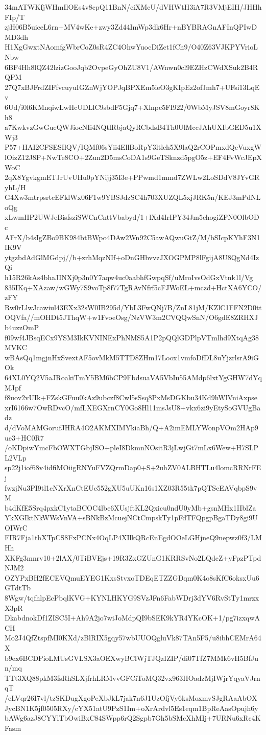 34mATWKfjWHmIlOEs4v8cpQ11BnN/ciXMcU/dVHWtH3iA7R3VMjEIH/JHHhFIp/T
zjH06B5uiceL6rn+MV4wKe+zwy3Zd44ImWp3dk6Hr+nBYBRAGnAFInQPIwDMD3dh
H1XgGwxtNAomfgWbrCoZ0sR4ZC4OhwYuocDiZct1fCh9/O40Z63VJKPYVrioLNbw
6BF4Hh8lQZ42lzizGooJqb2OvpeGyOhZU8V1/AWnwn0cl9EZHzCWdXSuk2B4RQPM
27Q7xBJFrdZIFfvcuyuIGZnWjYOPJqBPXEm5ieO3gKIpEz2ofJmh7+UFsi13LqEv
6Ud/i0l6KMnqiwLwHcUDLlC9sbdF5Gjq7+Xlnpc5FI922/0WbMyJSV8mGoyr8Kh8
a7KwkvzGwGueQWJiocNIi4NQtlRbjaQyRCbdsB4Th0UlMccJAhUXIbGED5u1XWj3
P57+HAI2CFSESIlQV/IQMf06sYii4EllBoRpY3ltlch5X9laQ2rCOPmxdQcVuxgW
lOizZ12J8P+NwTe8CO+2Zun2D5msCoDA1s9GeTSknzd5pgO5z+EF4FvWcJEpXWoC
2qX8YgvkgmETJrUvUHu0pYNijj35I3e+PPwmd1mmd7ZWLw2LoSDdV8JYvGRyhL/H
G4Xw3mtrpsrtcEFklWx06F1w9YBSJdzSC4h703XUZQL5xjJRK5n/KEJ3mPdNLoQg
xLwmHP2UWJeBisfsziSWCnCnttVbabyd/1+lXd4IrIPY34Jm5chogiZFN0OlbODc
AFrX/b4sIgZBo9BK984btBWpo4DAw2Wn92C5awAQwuGtZ/M/bSIcpKYhF3N1IK9V
ytgzbdAdGlMGdpj//b+zrhMqzNIf+oDnGHbvvzJXOGPMP8lFgijA8U8QgNd4IzQi
h15R26kAs4bhaJINXj0p3n0Y7aqw4uc0aabhfGwpqSf/uMroIvsOdGxVtnk1l/Vg
835IKq+XAzaw/wGWy7S9voTp8f77TgRAvNfrf5cFJWoEL+mczd+HctXA6YCO/zFY
Rw0rLlwJcawiul43EXx32sW0IB295d/YbL3FwQNj7B/ZnL81jM/KZlC1FFN2D0tt
OQVfa//mOHDt5JThqW+w1FvoeOsg/NzVW3m2CVQQwSnN/O6gdE8ZRHXJb4uzzOmP
f09wf4JBsqECx9YSM3IkKVNINExPhNMS5A1P2pQQlGDPlpVTmlhd9XtqAg38MVKC
wBAsQq1mgjnHxSvextAF5ovMkM5TTD8ZHm17Loox1vmfoDfDL8uYjzrlsrA9iGOk
64XL0YQ2V5aJRoakiTmY5BM6bCP9FbdsuaVA5VbIu55AMdp6lxtYgGHW7dYqMJpf
f8uov2vUIk+FZskGFuu0kAz9ubczf8Cwl5sSsq8PxMsDGKbu34Kd9hWlVniAxpse
xrI6166w7OwRDvcO/mfLXEGXrnCY0Go8Hl11msJsU8+vkx6zi9yEtySoGVUgBadz
d/dVoMAMGorufJHRA4O2AKMXIMYkiaBh/Q+A2imEMLYWonpVOm2HAp9ue3+HC0R7
/oKDpiwYmcFbOWXTGbjISO+pleI8DkmnNOsitR3jLwjGt7mLx6Wew+H7SLPL2VLp
sp22j1iof68v4idfiMOiigRNYuFVZQrmDap0+S+2uhZV0ALBHTLu4lomcRRNrFEj
fwzjNu3PI9tl1cNXrXnCtEUe552gXU5uUKn16s1XZ03R55tk7pQTSeEAVqbpS9vM
b4dKfE5Srq4pxkC1ytaBCOC4lbe6XUsjftKL2Qxicu0ndU0yMb+gsnMHx1IIblZa
YkXGIktNkWWsVnVA+sBNkBzMcuejNCtCmpskTy1pFdTFQpgpBgaTDy8gi9UOIWrC
FIR7Fja1thXTpCS8FxPCNx4OqLP4XIlkQRcEnEgdOOeLGHjneQ9nepwz0f3/LMHh
XKFg3mnrv10+2lAX/0TiBVEjs+19R3ZxGZUnG1KRRSvNo2LQdcZ+yFpzPTpdNJM2
OZYPxBH2fECEVQmuEYEG1KxsStvxoTDEqETZZGDqm0K4o8sKfC6oksxUu6GTdtTb
8Wgw/tqfhlpEcPbqlKVG+KYNLHKYG9SVzJFn6FabWDrj3dYV6RvStTy1mrzxX3pR
DkabdnokDf1ZISC5I+Ah9A2jo7wiJoMdpQI9bSEK9kYR4YKcOK+1/pg7izxqwACH
Mo2J4QfZtspfMI0KXd/zBlRIX5gqy57wbUUOQgluVk87TAn5F5/u8ibhCEMrA64X
b9ex6BCDPioLMUsGVLSX3aOEXwyBClWjTJQzIZIP/di07TfZ7MMk6vH5BfJun/mq
TTt3XQ88pkM3fsRhSLXjfrhLRMvvGFCiToMQ32vx963HOadzMjIWjrYqyaVJrnqT
/eLVqr26I7vl/tzSKDugXgoPeXbJkL7jak7n6J1UzOfjVy6ksMoxmvSJgRAaAbOX
JycBN1K5jf0505RXy/cYX51atU9PzS1Im+oXrArdvl5Es1eqm1BpReAasOpujh6y
bAWg6azJ8CYYlTbOwiBxC84SWpp6rQ2Sgpb7Gh5bSMcXhMIj+7URNu6xRc4KFasm
